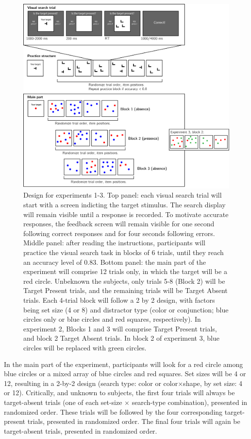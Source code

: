 \documentclass[
  english,
  man]{apa6}
\begin{document}
\begin{figure}
\includegraphics[width=1\linewidth]{figures/design} \caption{Design for experiments 1-3. Top panel: each visual search trial will start with a screen indicting the target stimulus. The search display will remain visible until a response is recorded. To motivate accurate responses, the feedback screen will remain visible for one second following correct responses and for four seconds following errors. Middle panel: after reading the instructions, participants will practice the visual search task in blocks of 6 trials, until they reach an accuracy level of 0.83. Bottom panel: the main part of the experiment will comprise 12 trials only, in which the target will be a red circle. Unbeknown the subjects, only trials 5-8 (Block 2) will be Target Present trials, and the remaining trials will be Target Absent trials. Each 4-trial block will follow a 2 by 2 design, with factors being set size (4 or 8) and distractor type (color or conjunction; blue circles only or blue circles and red squares, respectively). In experiment 2, Blocks 1 and 3 will comprise Target Present trials, and block 2 Target Absent trials. In block 2 of experiment 3, blue circles will be replaced with green circles.}\label{fig:design}
\end{figure}

In the main part of the experiment, participants will look for a red circle among blue circles or a mixed array of blue circles and red squares. Set sizes will be 4 or 12, resulting in a 2-by-2 design (search type: color or color\(\times\)shape, by set size: 4 or 12). Critically, and unknown to subjects, the first four trials will always be target-absent trials (one of each set-size \(\times\) search-type combination), presented in randomized order. These trials will be followed by the four corresponding target-present trials, presented in randomized order. The final four trials will again be target-absent trials, presented in randomized order.
\end{document}
